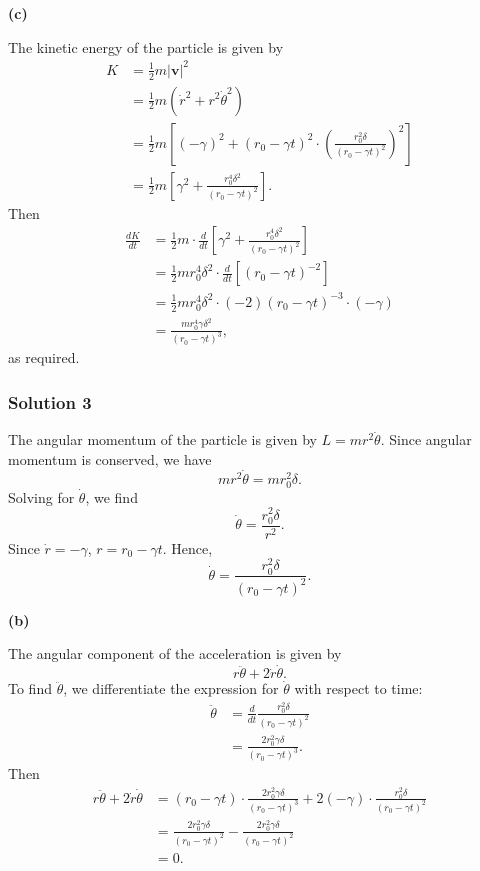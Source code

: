 \documentclass{article}
\begin{document}
\textbf{(c)} 

The kinetic energy of the particle is given by
\begin{align*}
K &= \frac{1}{2} m |\mathbf{v}|^2 \\
&= \frac{1}{2} m (\dot{r}^2 + r^2 \dot{\theta}^2) \\
&= \frac{1}{2} m \left[ (-\gamma)^2 + (r_0 - \gamma t)^2 \cdot \left( \frac{r_0^2 \delta}{(r_0 - \gamma t)^2} \right)^2 \right] \\
&= \frac{1}{2} m \left[ \gamma^2 + \frac{r_0^4 \delta^2}{(r_0 - \gamma t)^2} \right].
\end{align*}Then
\begin{align*}
\frac{dK}{dt} &= \frac{1}{2} m \cdot \frac{d}{dt} \left[ \gamma^2 + \frac{r_0^4 \delta^2}{(r_0 - \gamma t)^2} \right] \\
&= \frac{1}{2} m r_0^4 \delta^2 \cdot \frac{d}{dt} \left[ (r_0 - \gamma t)^{-2} \right] \\
&= \frac{1}{2} m r_0^4 \delta^2 \cdot (-2) (r_0 - \gamma t)^{-3} \cdot (-\gamma) \\
&= \frac{m r_0^4 \gamma \delta^2}{(r_0 - \gamma t)^3},
\end{align*}as required.

\subsubsection{Solution 3}
The angular momentum of the particle is given by 
$L = mr^2 \dot{\theta}$. Since angular momentum is conserved, we have
\[
mr^2 \dot{\theta} = mr_0^2 \delta.
\]
Solving for $\dot{\theta}$, we find
\[
\dot{\theta} = \frac{r_0^2 \delta}{r^2}.
\]
Since $\dot{r} = -\gamma$, $r = r_0 - \gamma t$.  Hence,
\[
\boxed{\dot{\theta} = \frac{r_0^2 \delta}{(r_0 - \gamma t)^2}}.
\]

\textbf{(b)} 

The angular component of the acceleration is given by
\[
r \ddot{\theta} + 2 \dot{r} \dot{\theta}.
\]
To find $\ddot{\theta}$, we differentiate the expression for $\dot{\theta}$ with respect to time:
\begin{align*}
\ddot{\theta} &= \frac{d}{dt} \frac{r_0^2 \delta}{(r_0 - \gamma t)^2} \\
&= \frac{2 r_0^2 \gamma \delta}{(r_0 - \gamma t)^3}.
\end{align*}
Then
\begin{align*}
r \ddot{\theta} + 2 \dot{r} \dot{\theta} &= (r_0 - \gamma t) \cdot \frac{2 r_0^2 \gamma \delta}{(r_0 - \gamma t)^3} + 2 (-\gamma) \cdot \frac{r_0^2 \delta}{(r_0 - \gamma t)^2} \\
&= \frac{2 r_0^2 \gamma \delta}{(r_0 - \gamma t)^2} - \frac{2 r_0^2 \gamma \delta}{(r_0 - \gamma t)^2} \\
&= \boxed{0}.
\end{align*}
\end{document}
